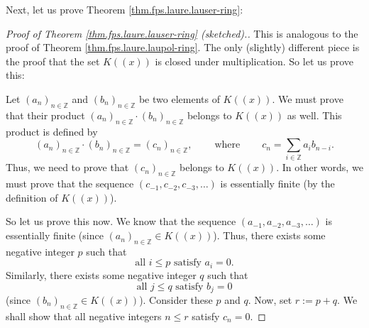 \begin{fineprint}
Next, let us prove Theorem \ref{thm.fps.laure.lauser-ring}:

\begin{proof}
[Proof of Theorem \ref{thm.fps.laure.lauser-ring} (sketched).]This is
analogous to the proof of Theorem \ref{thm.fps.laure.laupol-ring}. The only
(slightly) different piece is the proof that the set $K\left(  \left(
x\right)  \right)  $ is closed under multiplication. So let us prove this:

Let $\left(  a_{n}\right)  _{n\in\mathbb{Z}}$ and $\left(  b_{n}\right)
_{n\in\mathbb{Z}}$ be two elements of $K\left(  \left(  x\right)  \right)  $.
We must prove that their product $\left(  a_{n}\right)  _{n\in\mathbb{Z}}%
\cdot\left(  b_{n}\right)  _{n\in\mathbb{Z}}$ belongs to $K\left(  \left(
x\right)  \right)  $ as well. This product is defined by%
\[
\left(  a_{n}\right)  _{n\in\mathbb{Z}}\cdot\left(  b_{n}\right)
_{n\in\mathbb{Z}}=\left(  c_{n}\right)  _{n\in\mathbb{Z}}%
,\ \ \ \ \ \ \ \ \ \ \text{where}\ \ \ \ \ \ \ \ \ \ c_{n}=\sum_{i\in
\mathbb{Z}}a_{i}b_{n-i}.
\]
Thus, we need to prove that $\left(  c_{n}\right)  _{n\in\mathbb{Z}}$ belongs
to $K\left(  \left(  x\right)  \right)  $. In other words, we must prove that
the sequence $\left(  c_{-1},c_{-2},c_{-3},\ldots\right)  $ is essentially
finite (by the definition of $K\left(  \left(  x\right)  \right)  $).

So let us prove this now. We know that the sequence $\left(  a_{-1}%
,a_{-2},a_{-3},\ldots\right)  $ is essentially finite (since $\left(
a_{n}\right)  _{n\in\mathbb{Z}}\in K\left(  \left(  x\right)  \right)  $).
Thus, there exists some negative integer $p$ such that%
\begin{equation}
\text{all }i\leq p\text{ satisfy }a_{i}=0.
\label{pf.thm.fps.laure.lauser-ring.3}%
\end{equation}
Similarly, there exists some negative integer $q$ such that%
\begin{equation}
\text{all }j\leq q\text{ satisfy }b_{j}=0
\label{pf.thm.fps.laure.lauser-ring.4}%
\end{equation}
(since $\left(  b_{n}\right)  _{n\in\mathbb{Z}}\in K\left(  \left(  x\right)
\right)  $). Consider these $p$ and $q$. Now, set $r:=p+q$. We shall show that
all negative integers $n\leq r$ satisfy $c_{n}=0$.


\end{proof}
\end{fineprint}
